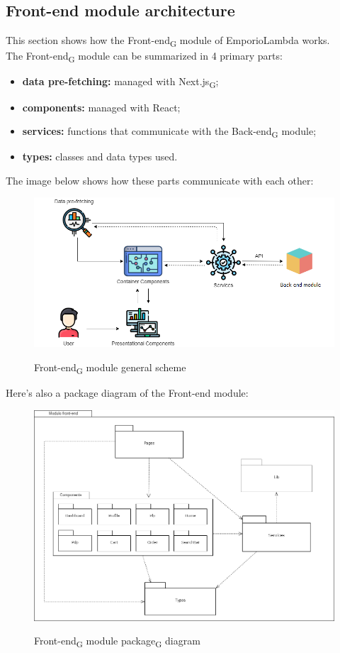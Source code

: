\subsection{Front-end module architecture}
This section shows how the Front-end\textsubscript{G} module of EmporioLambda works. \\The Front-end\textsubscript{G} module can be summarized in 4 primary parts:
\begin{itemize}
\item \textbf{data pre-fetching:} managed with Next.js\textsubscript{G};
\item \textbf{components:} managed with React;
\item \textbf{services:} functions that communicate with the Back-end\textsubscript{G} module;
\item \textbf{types:} classes and data types used.
\end{itemize} 
The image below shows how these parts communicate with each other:
\begin{figure}[H]
\centering
\includegraphics[scale=0.70]{res/Architettura/Frontend/img/general_frontend}\\
\caption{Front-end\textsubscript{G} module general scheme}
\end{figure}
\newpage
Here's also a package diagram of the Front-end module:
\begin{figure}[H]
\centering
\includegraphics[scale=0.40]{res/Architettura/Frontend/img/package_frontend}\\
\caption{Front-end\textsubscript{G} module package\textsubscript{G} diagram}
\end{figure}

